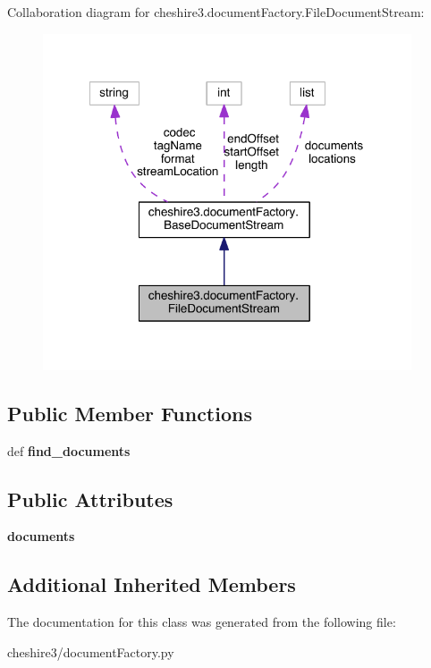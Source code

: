 Collaboration diagram for cheshire3.\-document\-Factory.\-File\-Document\-Stream\-:
\nopagebreak
\begin{figure}[H]
\begin{center}
\leavevmode
\includegraphics[width=309pt]{classcheshire3_1_1document_factory_1_1_file_document_stream__coll__graph}
\end{center}
\end{figure}
\subsection*{Public Member Functions}
\begin{DoxyCompactItemize}
\item 
\hypertarget{classcheshire3_1_1document_factory_1_1_file_document_stream_ab8f10b3d892ab52d3dde67f586983274}{def {\bfseries find\-\_\-documents}}\label{classcheshire3_1_1document_factory_1_1_file_document_stream_ab8f10b3d892ab52d3dde67f586983274}

\end{DoxyCompactItemize}
\subsection*{Public Attributes}
\begin{DoxyCompactItemize}
\item 
\hypertarget{classcheshire3_1_1document_factory_1_1_file_document_stream_ade1cff778be35d8c4cfb9c633ed71069}{{\bfseries documents}}\label{classcheshire3_1_1document_factory_1_1_file_document_stream_ade1cff778be35d8c4cfb9c633ed71069}

\end{DoxyCompactItemize}
\subsection*{Additional Inherited Members}


The documentation for this class was generated from the following file\-:\begin{DoxyCompactItemize}
\item 
cheshire3/document\-Factory.\-py\end{DoxyCompactItemize}
